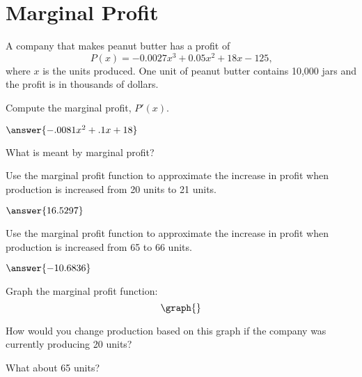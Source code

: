 \documentclass{ximera}
\begin{document}
\section{Marginal Profit}
A company that makes peanut butter has a profit of $$P(x)=-0.0027x^3+0.05x^2+18x-125\text{,}$$ where $x$ is the units produced. One unit of peanut butter contains 10,000 jars and the profit is in thousands of dollars.
\begin{question}
Compute the marginal profit, $P'(x)$.

$\answer{-.0081x^2+.1x+18}$

What is meant by marginal profit?
\begin{freeResponse}
\end{freeResponse}

Use the marginal profit function to approximate the increase in profit when production is increased from 20 units to 21 units.

$\answer{16.5297}$

Use the marginal profit function to approximate the increase in profit when production is increased from 65 to 66 units.

$\answer{-10.6836}$

Graph the marginal profit function:
\[
\graph{}
\]

How would you change production based on this graph if the company was currently producing 20 units?

\begin{multipleChoice}
\end{multipleChoice}

What about 65 units?

\begin{multipleChoice}
\end{multipleChoice}
\end{question}
\setcounter{problem}{0}
\end{document}
